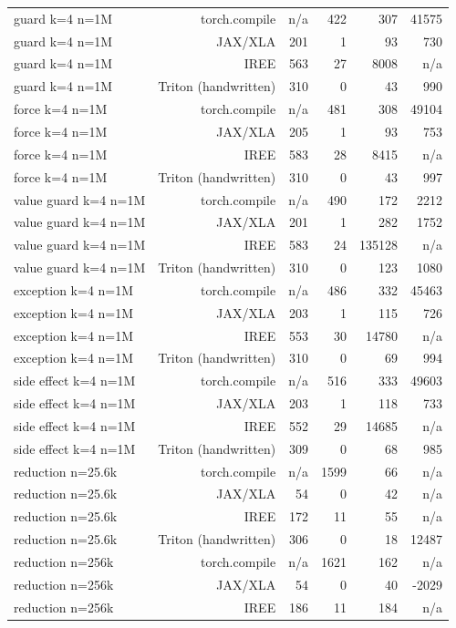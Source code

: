 \begin{tabular}{lrrrrr}
guard k=4 n=1M & torch.compile & n/a & 422 & 307 & 41575 \\
guard k=4 n=1M & JAX/XLA & 201 & 1 & 93 & 730 \\
guard k=4 n=1M & IREE & 563 & 27 & 8008 & n/a \\
guard k=4 n=1M & Triton (handwritten) & 310 & 0 & 43 & 990 \\
force k=4 n=1M & torch.compile & n/a & 481 & 308 & 49104 \\
force k=4 n=1M & JAX/XLA & 205 & 1 & 93 & 753 \\
force k=4 n=1M & IREE & 583 & 28 & 8415 & n/a \\
force k=4 n=1M & Triton (handwritten) & 310 & 0 & 43 & 997 \\
value guard k=4 n=1M & torch.compile & n/a & 490 & 172 & 2212 \\
value guard k=4 n=1M & JAX/XLA & 201 & 1 & 282 & 1752 \\
value guard k=4 n=1M & IREE & 583 & 24 & 135128 & n/a \\
value guard k=4 n=1M & Triton (handwritten) & 310 & 0 & 123 & 1080 \\
exception k=4 n=1M & torch.compile & n/a & 486 & 332 & 45463 \\
exception k=4 n=1M & JAX/XLA & 203 & 1 & 115 & 726 \\
exception k=4 n=1M & IREE & 553 & 30 & 14780 & n/a \\
exception k=4 n=1M & Triton (handwritten) & 310 & 0 & 69 & 994 \\
side effect k=4 n=1M & torch.compile & n/a & 516 & 333 & 49603 \\
side effect k=4 n=1M & JAX/XLA & 203 & 1 & 118 & 733 \\
side effect k=4 n=1M & IREE & 552 & 29 & 14685 & n/a \\
side effect k=4 n=1M & Triton (handwritten) & 309 & 0 & 68 & 985 \\
reduction n=25.6k & torch.compile & n/a & 1599 & 66 & n/a \\
reduction n=25.6k & JAX/XLA & 54 & 0 & 42 & n/a \\
reduction n=25.6k & IREE & 172 & 11 & 55 & n/a \\
reduction n=25.6k & Triton (handwritten) & 306 & 0 & 18 & 12487 \\
reduction n=256k & torch.compile & n/a & 1621 & 162 & n/a \\
reduction n=256k & JAX/XLA & 54 & 0 & 40 & -2029 \\
reduction n=256k & IREE & 186 & 11 & 184 & n/a \\

\end{tabular}
